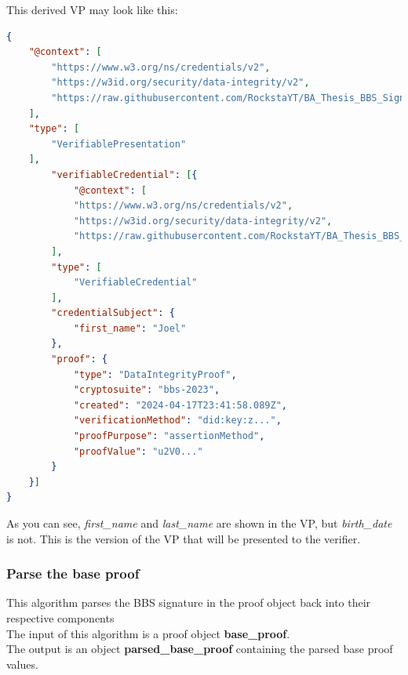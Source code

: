 \documentclass[
	a4paper               %
	,BCOR=0mm            %
	,bibliography=totoc   %
	,listof=totoc         %
	,monolingual
	,twoside=false
]{bfhthesis}              %
\begin{document}
This derived VP may look like this:
\begin{lstlisting}[language=json,firstnumber=1,caption={Derived VP},captionpos=b]
{
	"@context": [
		"https://www.w3.org/ns/credentials/v2",
		"https://w3id.org/security/data-integrity/v2",
		"https://raw.githubusercontent.com/RockstaYT/BA_Thesis_BBS_Signatures/docs/context/example_1.jsonld"
	],
	"type": [
		"VerifiablePresentation"
	],
		"verifiableCredential": [{
			"@context": [
			"https://www.w3.org/ns/credentials/v2",
			"https://w3id.org/security/data-integrity/v2",
			"https://raw.githubusercontent.com/RockstaYT/BA_Thesis_BBS_Signatures/docs/context/example_1.jsonld"
		],
		"type": [
			"VerifiableCredential"
		],
		"credentialSubject": {
			"first_name": "Joel"
		},
		"proof": {
			"type": "DataIntegrityProof",
			"cryptosuite": "bbs-2023",
			"created": "2024-04-17T23:41:58.089Z",
			"verificationMethod": "did:key:z...",
			"proofPurpose": "assertionMethod",
			"proofValue": "u2V0..."
		}
	}]
}
\end{lstlisting}

As you can see, \textit{first\_name} and \textit{last\_name} are shown in the VP, but \textit{birth\_date} is not.
This is the version of the VP that will be presented to the verifier.

\subsubsection{Parse the base proof}
\label{subsub:parsebaseproof}
This algorithm parses the BBS signature in the proof object back into their respective components\\

The input of this algorithm is a proof object \textbf{base\_proof}.\\

The output is an object \textbf{parsed\_base\_proof} containing the parsed base proof values.\\
\end{document}

